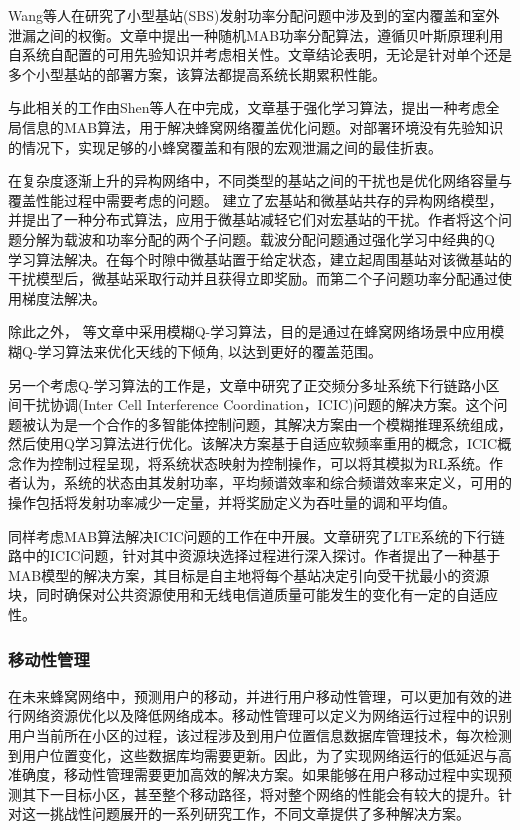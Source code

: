 \documentclass{IEEEtran}
\begin{document}
Wang等人在\cite{Wang2017}研究了小型基站(SBS)发射功率分配问题中涉及到的室内覆盖和室外泄漏之间的权衡。文章中提出一种随机MAB功率分配算法，遵循贝叶斯原理利用自系统自配置的可用先验知识并考虑相关性。文章结论表明，无论是针对单个还是多个小型基站的部署方案，该算法都提高系统长期累积性能。

与此相关的工作由Shen等人在\cite{Shen2018}中完成，文章基于强化学习算法，提出一种考虑全局信息的MAB算法，用于解决蜂窝网络覆盖优化问题。对部署环境没有先验知识的情况下，实现足够的小蜂窝覆盖和有限的宏观泄漏之间的最佳折衷。

在复杂度逐渐上升的异构网络中，不同类型的基站之间的干扰也是优化网络容量与覆盖性能过程中需要考虑的问题。
\cite{Bennis2010}建立了宏基站和微基站共存的异构网络模型，并提出了一种分布式算法，应用于微基站减轻它们对宏基站的干扰。作者将这个问题分解为载波和功率分配的两个子问题。载波分配问题通过强化学习中经典的Q 学习算法解决。在每个时隙中微基站置于给定状态，建立起周围基站对该微基站的干扰模型后，微基站采取行动并且获得立即奖励。而第二个子问题功率分配通过使用梯度法解决。

除此之外，\cite{Razavi2010}\cite{Razavi2010a}\cite{Islam2012} 等文章中采用模糊Q-学习算法，目的是通过在蜂窝网络场景中应用模糊Q-学习算法来优化天线的下倾角, 以达到更好的覆盖范围。

另一个考虑Q-学习算法的工作是\cite{Dirani2010}，文章中研究了正交频分多址系统下行链路小区间干扰协调(Inter Cell Interference Coordination，ICIC)问题的解决方案。这个问题被认为是一个合作的多智能体控制问题，其解决方案由一个模糊推理系统组成，然后使用Q学习算法进行优化。该解决方案基于自适应软频率重用的概念，ICIC概念作为控制过程呈现，将系统状态映射为控制操作，可以将其模拟为RL系统。作者认为，系统的状态由其发射功率，平均频谱效率和综合频谱效率来定义，可用的操作包括将发射功率减少一定量，并将奖励定义为吞吐量的调和平均值。

同样考虑MAB算法解决ICIC问题的工作在\cite{Coucheney2015}中开展。文章研究了LTE系统的下行链路中的ICIC问题，针对其中资源块选择过程进行深入探讨。作者提出了一种基于MAB模型的解决方案，其目标是自主地将每个基站决定引向受干扰最小的资源块，同时确保对公共资源使用和无线电信道质量可能发生的变化有一定的自适应性。



\subsubsection{移动性管理}
在未来蜂窝网络中，预测用户的移动，并进行用户移动性管理，可以更加有效的进行网络资源优化以及降低网络成本。移动性管理可以定义为网络运行过程中的识别用户当前所在小区的过程，该过程涉及到用户位置信息数据库管理技术，每次检测到用户位置变化，这些数据库均需要更新。因此，为了实现网络运行的低延迟与高准确度，移动性管理需要更加高效的解决方案。如果能够在用户移动过程中实现预测其下一目标小区，甚至整个移动路径，将对整个网络的性能会有较大的提升。针对这一挑战性问题展开的一系列研究工作，不同文章提供了多种解决方案。
\end{document}
